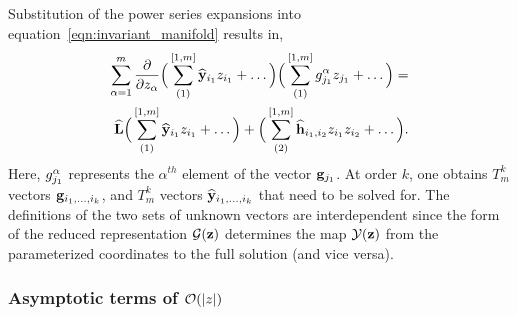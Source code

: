 Substitution of the power series expansions into equation~\eqref{eqn:invariant_manifold} results in,
\begin{align}
	\label{eqn:asymptotic_substitution}
	\begin{split}
		\sum^{m}_{\alpha=1}\dfrac{\partial }{\partial z_{\alpha}}\Big(\sum^{[1,m]}_{(1)}\widehat{\mathbf{y}}_{i_{1}}z_{i_{1}} + \ldots \Big)	 \Big(\sum^{[1,m]}_{(1)}g^{\alpha}_{j_{1}}z_{j_{1}} +\ldots \Big)= \\
		\mathbf{\widehat{L}}\Big(\sum^{[1,m]}_{(1)}\widehat{\mathbf{y}}_{i_{1}}z_{i_{1}} + \ldots \Big)  +
		\Big(\sum^{[1,m]}_{(2)}\widehat{\mathbf{h}}_{i_{1},i_{2}}z_{i_{1}}z_{i_{2}} + \ldots\Big).
	\end{split}
\end{align}
Here, $g^{\alpha}_{j_{1}}$ represents the $\alpha^{th}$ element of the vector $\mathbf{g}_{j_{1}}$. At order $k$, one obtains $T^{k}_{m}$ vectors $\mathbf{g}_{i_{1},\ldots,i_{k}}$, and $T^{k}_{m}$ vectors $\widehat{\mathbf{y}}_{i_{1},\ldots,i_{k}}$ that need to be solved for. The definitions of the two sets of unknown vectors are interdependent since the form of the reduced representation $\mathcal{G}(\mathbf{z})$ determines the map $\mathcal{Y}(\mathbf{z})$ from the parameterized coordinates to the full solution (and vice versa). 

\subsubsection{Asymptotic terms of $\mathcal{O}(|z|)$}
\label{sec:normal_form_O1}

